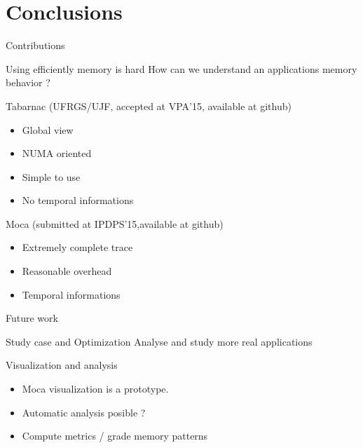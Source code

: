 \documentclass[xcolor={usenames,dvipsnames}]{beamer}
\begin{document}
\section{Conclusions}
\begin{frame}{Contributions}
    \begin{exampleblock}{Using efficiently memory is hard}
        How can we understand an applications memory behavior ?
    \end{exampleblock}
    \pause
    \begin{block}{Tabarnac (UFRGS/UJF, accepted at VPA'15, available at
        github)}
        \begin{itemize}
            \item Global view
            \item NUMA oriented
            \item Simple to use
            \item No temporal informations
        \end{itemize}
    \end{block}
    \pause
    \begin{alertblock}{Moca (submitted at IPDPS'15,available at github)}
        \begin{itemize}
            \item Extremely complete trace
            \item Reasonable overhead
            \item Temporal informations
        \end{itemize}
    \end{alertblock}
\end{frame}

\setcounter{finalframe}{\value{framenumber}}

\begin{frame}{Future work}
    \begin{block}{Study case and Optimization}
        Analyse and study more real applications
    \end{block}
    \pause
    \begin{alertblock}{Visualization and analysis}
        \begin{itemize}[<+->]
            \item Moca visualization is a prototype.
            \item Automatic analysis posible ?
            \item Compute metrics / grade memory patterns
        \end{itemize}
    \end{alertblock}
\end{frame}
\end{document}
